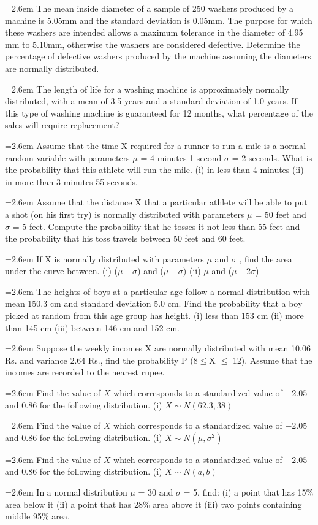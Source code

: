 \documentclass[11pt,a4paper]{article}
\newcommand{\Q}[2]{\par\smallskip\noindent\hangindent=2.6em\hangafter=1
  \makebox[2.6em][l]{\textbf{#1.}}#2\par}
\begin{document}
\Q{1}{The mean inside diameter of a sample of 250 washers produced by a machine is 5.05mm and the standard deviation is 0.05mm. The purpose for which these washers are intended allows a maximum tolerance in the diameter of 4.95 mm to 5.10mm, otherwise the washers are considered defective. Determine the percentage of defective washers produced by the machine assuming the diameters are normally distributed.}
\Q{2}{The length of life for a washing machine is approximately normally distributed, with a mean of 3.5 years and a standard deviation of 1.0 years. If this type of washing machine is guaranteed for 12 months, what percentage of the sales will require replacement?}
\Q{3}{Assume that the time X required for a runner to run a mile is a normal random variable with parameters $\mu$ = 4 minutes 1 second $\sigma$ = 2 seconds. What is the probability that this athlete will run the mile. (i) in less than 4 minutes (ii) in more than 3 minutes 55 seconds.}
\Q{4}{Assume that the distance X that a particular athlete will be able to put a shot (on his first try) is normally distributed with parameters $\mu$ = 50 feet and $\sigma$ = 5 feet. Compute the probability that he tosses it not less than 55 feet and the probability that his toss travels between 50 feet and 60 feet.}
\Q{5}{If X is normally distributed with parameters $\mu$ and $\sigma$ , find the area under the curve between. (i) ($\mu$ −$\sigma$) and ($\mu$ +$\sigma$) (ii) $\mu$ and ($\mu$ +2$\sigma$)}
\Q{6}{The heights of boys at a particular age follow a normal distribution with mean 150.3 cm and standard deviation 5.0 cm. Find the probability that a boy picked at random from this age group has height. (i) less than 153 cm (ii) more than 145 cm (iii) between 146 cm and 152 cm.}
\Q{7}{Suppose the weekly incomes X are normally distributed with mean 10.06 Rs. and variance 2.64 Rs., find the probability P (8$\le$X $\le$ 12). Assume that the incomes are recorded to the nearest rupee.}
\Q{8}{Find the value of $X$ which corresponds to a standardized value of $-2.05$ and $0.86$ for the following distribution. (i) $X\sim N(62.3,38)$}
\Q{9}{Find the value of $X$ which corresponds to a standardized value of $-2.05$ and $0.86$ for the following distribution. (i) $X\sim N(\mu,\sigma^{2})$}
\Q{10}{Find the value of $X$ which corresponds to a standardized value of $-2.05$ and $0.86$ for the following distribution. (i) $X\sim N(a,b)$}
\Q{11}{In a normal distribution $\mu$ = 30 and $\sigma$ = 5, find: (i) a point that has 15\% area below it (ii) a point that has 28\% area above it (iii) two points containing middle 95\% area.}
\end{document}
